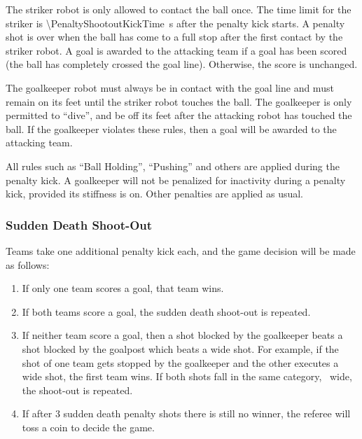 The striker robot is only allowed to contact the ball once.
The time limit for the striker is \qty{\PenaltyShootoutKickTime}{\second} after the penalty kick starts.
A penalty shot is over when the ball has come to a full stop after the first contact by the striker robot.
A goal is awarded to the attacking team if a goal has been scored (\ie the ball has completely crossed the goal line).
Otherwise, the score is unchanged.

The goalkeeper robot must always be in contact with the goal line and must remain on its feet until the striker robot touches the ball.
The goalkeeper is only permitted to ``dive'', and be off its feet after the attacking robot has touched the ball.
If the goalkeeper violates these rules, then a goal will be awarded to the attacking team.

All rules such as ``Ball Holding'', ``Pushing'' and others are applied during the penalty kick.
A goalkeeper will not be penalized for inactivity during a penalty kick, provided its stiffness is on.
Other penalties are applied as usual.

\subsubsection{Sudden Death Shoot-Out}
\label{sec:sudden_death_shoot_out}

Teams take one additional penalty kick each, and the game decision will be made as follows:

\begin{enumerate}
  \item If only one team scores a goal, that team wins.
  \item If both teams score a goal, the sudden death shoot-out is repeated.
  \item If neither team score a goal, then a shot blocked by the goalkeeper beats a shot blocked by the goalpost which beats a wide shot. For example, if the shot of one team gets stopped by the goalkeeper and the other executes a wide shot, the first team wins. If both shots fall in the same category, \eg~wide, the shoot-out is repeated.
  \item If after 3 sudden death penalty shots there is still no winner, the referee will toss a coin to decide the game.
\end{enumerate}

